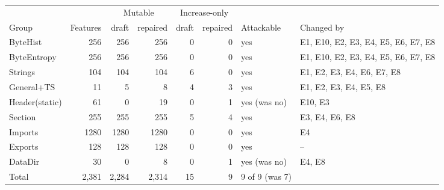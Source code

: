 \begin{tabular}{lrrrrrll}
\toprule
 & & \multicolumn{2}{c}{Mutable} & \multicolumn{2}{c}{Increase-only} & & \\
\cmidrule(lr){3-4}\cmidrule(lr){5-6}
Group & Features & draft & repaired & draft & repaired & Attackable & Changed by \\
\midrule
ByteHist & 256 & 256 & 256 & 0 & 0 & yes & E1, E10, E2, E3, E4, E5, E6, E7, E8 \\
ByteEntropy & 256 & 256 & 256 & 0 & 0 & yes & E1, E10, E2, E3, E4, E5, E6, E7, E8 \\
Strings & 104 & 104 & 104 & 6 & 0 & yes & E1, E2, E3, E4, E6, E7, E8 \\
General+TS & 11 & 5 & 8 & 4 & 3 & yes & E1, E2, E3, E4, E5, E8 \\
Header(static) & 61 & 0 & 19 & 0 & 1 & yes (was no) & E10, E3 \\
Section & 255 & 255 & 255 & 5 & 4 & yes & E3, E4, E6, E8 \\
Imports & 1280 & 1280 & 1280 & 0 & 0 & yes & E4 \\
Exports & 128 & 128 & 128 & 0 & 0 & yes & -- \\
DataDir & 30 & 0 & 8 & 0 & 1 & yes (was no) & E4, E8 \\
\midrule
Total & 2{,}381 & 2{,}284 & 2{,}314 & 15 & 9 & 9 of 9 (was 7) & \\
\bottomrule
\end{tabular}